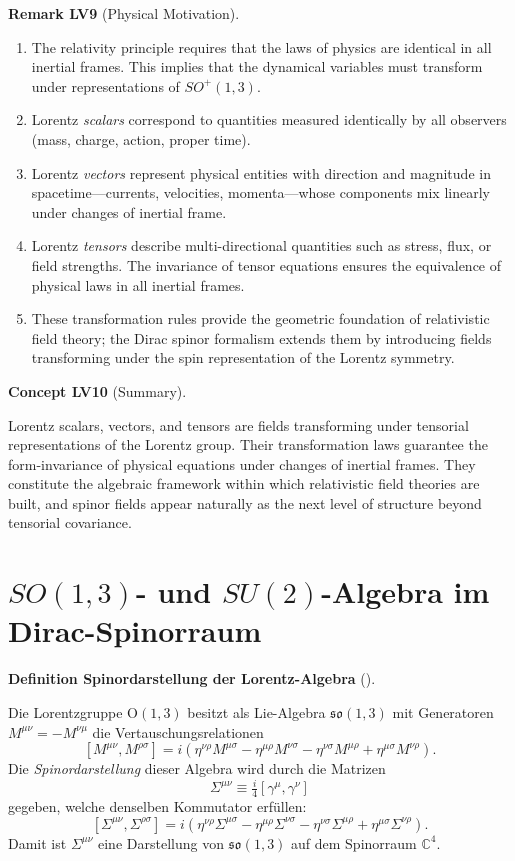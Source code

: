\documentclass[10pt, letterpaper]{article}
\newcommand{\C}{\mathbb{C}}
\newcommand{\Ogroup}{\mathrm{O}}
\newcommand{\CustomHeading}[3]{%
  \par\medskip\noindent%
  \textbf{#1 #2} \textnormal{(#3)}.\enskip%
}
\newenvironment{DEF}[2]{\begin{unitbox}\CustomHeading{Definition}{#1}{#2}}{\end{unitbox}}
\newenvironment{REM}[2]{\begin{unitbox}\CustomHeading{Remark}{#1}{#2}}{\end{unitbox}}
\newenvironment{CONC}[2]{\begin{unitbox}\CustomHeading{Concept}{#1}{#2}}{\end{unitbox}}
\begin{document}
\begin{REM}{LV9}{Physical Motivation}
\begin{enumerate}[label=\roman*)]
\item The relativity principle requires that the laws of physics are identical in all inertial frames.  
  This implies that the dynamical variables must transform under representations of $SO^+(1,3)$.
\item Lorentz \emph{scalars} correspond to quantities measured identically by all observers (mass, charge, action, proper time).
\item Lorentz \emph{vectors} represent physical entities with direction and magnitude in spacetime—currents, velocities, momenta—whose components mix linearly under changes of inertial frame.
\item Lorentz \emph{tensors} describe multi-directional quantities such as stress, flux, or field strengths.  
  The invariance of tensor equations ensures the equivalence of physical laws in all inertial frames.
\item These transformation rules provide the geometric foundation of relativistic field theory; 
  the Dirac spinor formalism extends them by introducing fields transforming under the spin representation of the Lorentz symmetry.
\end{enumerate}
\end{REM}

\begin{CONC}{LV10}{Summary}
Lorentz scalars, vectors, and tensors are fields transforming under tensorial representations of the Lorentz group.  
Their transformation laws guarantee the form-invariance of physical equations under changes of inertial frames.  
They constitute the algebraic framework within which relativistic field theories are built, and 
spinor fields appear naturally as the next level of structure beyond tensorial covariance.
\end{CONC}



\pagebreak


\section{$SO(1,3)$- und $SU(2)$-Algebra im Dirac-Spinorraum}

\begin{DEF}{Spinordarstellung der Lorentz-Algebra}{}
Die Lorentzgruppe $\Ogroup(1,3)$ besitzt als Lie-Algebra $\mathfrak{so}(1,3)$ mit Generatoren $M^{\mu\nu}=-M^{\nu\mu}$ die Vertauschungsrelationen
\[
[M^{\mu\nu},M^{\rho\sigma}]
= i(\eta^{\nu\rho}M^{\mu\sigma}
- \eta^{\mu\rho}M^{\nu\sigma}
- \eta^{\nu\sigma}M^{\mu\rho}
+ \eta^{\mu\sigma}M^{\nu\rho}).
\]
Die \emph{Spinordarstellung} dieser Algebra wird durch die Matrizen
\[
\boxed{
\Sigma^{\mu\nu} \equiv \tfrac{i}{4}[\gamma^{\mu},\gamma^{\nu}]
}
\]
gegeben, welche denselben Kommutator erfüllen:
\[
[\Sigma^{\mu\nu},\Sigma^{\rho\sigma}]
= i(\eta^{\nu\rho}\Sigma^{\mu\sigma}
- \eta^{\mu\rho}\Sigma^{\nu\sigma}
- \eta^{\nu\sigma}\Sigma^{\mu\rho}
+ \eta^{\mu\sigma}\Sigma^{\nu\rho}).
\]
Damit ist $\Sigma^{\mu\nu}$ eine Darstellung von $\mathfrak{so}(1,3)$ auf dem Spinorraum $\C^4$.
\end{DEF}
\end{document}
